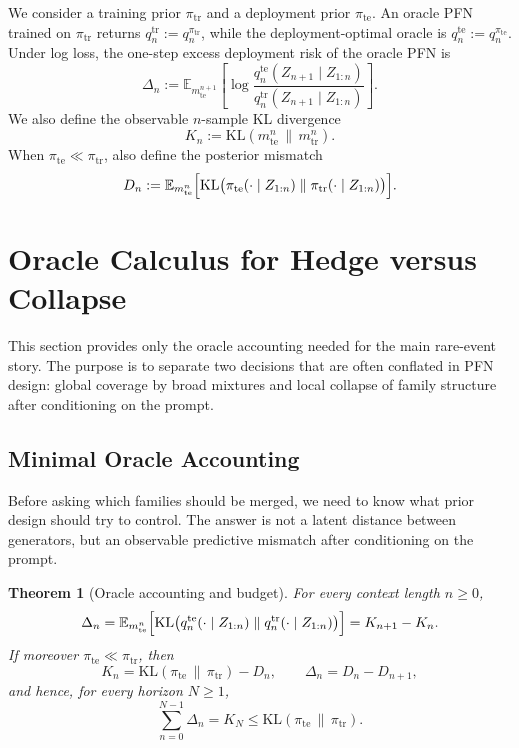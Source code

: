 \documentclass{article}
\newtheorem{theorem}{Theorem}
\theoremstyle{definition}
\theoremstyle{remark}
\newcommand{\E}{\mathbb{E}}
\newcommand{\KL}{\mathrm{KL}}
\newcommand{\tr}{\mathrm{tr}}
\newcommand{\te}{\mathrm{te}}
\begin{document}
We consider a training prior $\pi_{\tr}$ and a deployment prior $\pi_{\te}$. An oracle PFN trained on $\pi_{\tr}$ returns $q_n^{\tr}:=q_n^{\pi_{\tr}}$, while the deployment-optimal oracle is $q_n^{\te}:=q_n^{\pi_{\te}}$. Under log loss, the one-step excess deployment risk of the oracle PFN is
\[
\Delta_n
:=
\E_{m_{\te}^{n+1}}
\left[
\log
\frac{q_n^{\te}(Z_{n+1}\mid Z_{1:n})}
{q_n^{\tr}(Z_{n+1}\mid Z_{1:n})}
\right].
\]
We also define the observable $n$-sample KL divergence
\[
K_n := \KL(m_{\te}^n \,\|\, m_{\tr}^n).
\]
When $\pi_{\te}\ll\pi_{\tr}$, also define the posterior mismatch
\[
D_n
:=
\E_{m_{\te}^{n}}
\Bigl[
\KL\bigl(
\pi_{\te}(\cdot\mid Z_{1:n})
\;\|\;
\pi_{\tr}(\cdot\mid Z_{1:n})
\bigr)
\Bigr].
\]

\section{Oracle Calculus for Hedge versus Collapse}
\label{sec:oracle-design}

This section provides only the oracle accounting needed for the main rare-event story. The purpose is to separate two decisions that are often conflated in PFN design: global coverage by broad mixtures and local collapse of family structure after conditioning on the prompt.

\subsection{Minimal Oracle Accounting}

Before asking which families should be merged, we need to know what prior design should try to control. The answer is not a latent distance between generators, but an observable predictive mismatch after conditioning on the prompt.

\begin{theorem}[Oracle accounting and budget]
\label{thm:exact}
For every context length $n\ge 0$,
\[
\Delta_n
=
\E_{m_{\te}^{n}}
\Bigl[
\KL\bigl(
q_n^{\te}(\cdot\mid Z_{1:n})
\;\|\;
q_n^{\tr}(\cdot\mid Z_{1:n})
\bigr)
\Bigr]
=
K_{n+1}-K_n.
\]
If moreover $\pi_{\te}\ll\pi_{\tr}$, then
\[
K_n = \KL(\pi_{\te}\,\|\,\pi_{\tr}) - D_n,
\qquad
\Delta_n = D_n-D_{n+1},
\]
and hence, for every horizon $N\ge 1$,
\[
\sum_{n=0}^{N-1}\Delta_n = K_N \le \KL(\pi_{\te}\,\|\,\pi_{\tr}).
\]
\end{theorem}
\end{document}
